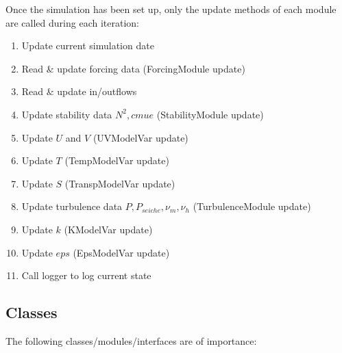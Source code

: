 \documentclass[paper=a4, fontsize=12pt]{article}
\begin{document}
Once the simulation has been set up, only the update methods of each module are called during each iteration:
\begin{enumerate}
	\item Update current simulation date
	\item Read \& update forcing data (ForcingModule update)
	\item Read \& update in/outflows
	\item Update stability data $N^{2},cmue$ (StabilityModule update)
	\item Update $U$ and $V$ (UVModelVar update)
	\item Update $T$ (TempModelVar update)
	\item Update $S$ (TranspModelVar update)
	\item Update turbulence data $P,P_{seiche},\nu_{m},\nu_{h}$ (TurbulenceModule update)
	\item Update $k$ (KModelVar update)
	\item Update $eps$ (EpsModelVar update)
	\item Call logger to log current state
\end{enumerate}

\newpage
\subsection{Classes}

The following classes/modules/interfaces are of importance:
\end{document}
